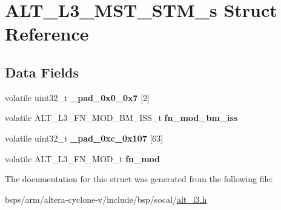 \hypertarget{structALT__L3__MST__STM__s}{}\section{A\+L\+T\+\_\+\+L3\+\_\+\+M\+S\+T\+\_\+\+S\+T\+M\+\_\+s Struct Reference}
\label{structALT__L3__MST__STM__s}
\subsection*{Data Fields}
\begin{DoxyCompactItemize}
\item 
\mbox{\label{structALT__L3__MST__STM__s_a87540463c02fc94a86caf02de0ebc89f}} 
volatile uint32\+\_\+t {\bfseries \+\_\+pad\+\_\+0x0\+\_\+0x7} \mbox{[}2\mbox{]}
\item 
\mbox{\label{structALT__L3__MST__STM__s_a1a48893d35ce7ad5ee4e47cdf95864b3}} 
volatile A\+L\+T\+\_\+\+L3\+\_\+\+F\+N\+\_\+\+M\+O\+D\+\_\+\+B\+M\+\_\+\+I\+S\+S\+\_\+t {\bfseries fn\+\_\+mod\+\_\+bm\+\_\+iss}
\item 
\mbox{\label{structALT__L3__MST__STM__s_ab02c4b79c201b1b88cabf938c25141e1}} 
volatile uint32\+\_\+t {\bfseries \+\_\+pad\+\_\+0xc\+\_\+0x107} \mbox{[}63\mbox{]}
\item 
\mbox{\label{structALT__L3__MST__STM__s_ad4f7a684cb435b29ad89261e197b2c6d}} 
volatile A\+L\+T\+\_\+\+L3\+\_\+\+F\+N\+\_\+\+M\+O\+D\+\_\+t {\bfseries fn\+\_\+mod}
\end{DoxyCompactItemize}


The documentation for this struct was generated from the following file\+:\begin{DoxyCompactItemize}
\item 
bsps/arm/altera-\/cyclone-\/v/include/bsp/socal/\mbox{\hyperlink{alt__l3_8h}{alt\+\_\+l3.\+h}}\end{DoxyCompactItemize}
